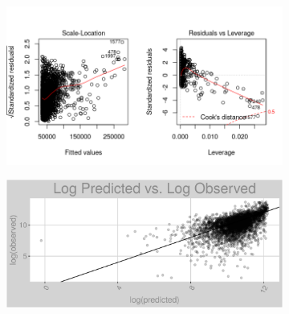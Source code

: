 \begin{figure}[h]
\centering
\begin{subfigure}{1\textwidth}
\centering
\includegraphics[width=.99\textwidth, height=0.425\textheight]{Images/natural_gas_psf_nn_res_2.png}
\end{subfigure}
\begin{subfigure}{1\textwidth}
\centering
\includegraphics[width=.99\textwidth, height=0.475\textheight]{Images/natural_gas_psf_nn_pvo.png}
\end{subfigure}
\end{figure}
\FloatBarrier
\newpage

